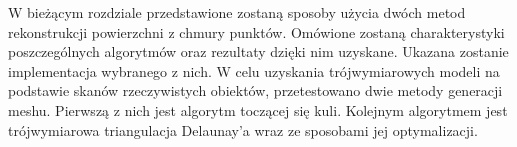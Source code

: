 W bieżącym rozdziale przedstawione zostaną sposoby użycia dwóch metod rekonstrukcji powierzchni z chmury punktów. Omówione zostaną charakterystyki poszczególnych algorytmów oraz rezultaty dzięki nim uzyskane. Ukazana zostanie implementacja wybranego z nich.
W celu uzyskania trójwymiarowych modeli na podstawie skanów rzeczywistych obiektów, przetestowano dwie metody generacji meshu. Pierwszą z nich jest algorytm toczącej się kuli. Kolejnym algorytmem jest trójwymiarowa triangulacja Delaunay'a wraz ze sposobami jej optymalizacji.

